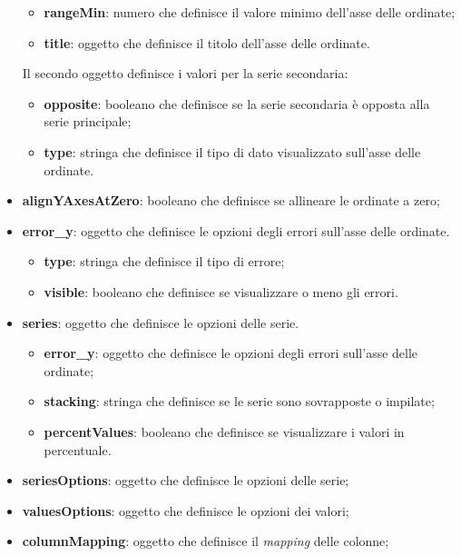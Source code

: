 \begin{itemize}
\begin{itemize}
                  \item \textbf{rangeMin}: numero che definisce il valore minimo dell'asse delle ordinate;
                  \item \textbf{title}: oggetto che definisce il titolo dell'asse delle ordinate.
            \end{itemize}
            Il secondo oggetto definisce i valori per la serie secondaria:
            \begin{itemize}
                  \item \textbf{opposite}: booleano che definisce se la serie secondaria è opposta alla serie principale;
                  \item \textbf{type}: stringa che definisce il tipo di dato visualizzato sull'asse delle ordinate.
            \end{itemize}
      \item \textbf{alignYAxesAtZero}: booleano che definisce se allineare le ordinate a zero;
      \item \textbf{error\_y}: oggetto che definisce le opzioni degli errori sull'asse delle ordinate.
            \begin{itemize}
                  \item \textbf{type}: stringa che definisce il tipo di errore;
                  \item \textbf{visible}: booleano che definisce se visualizzare o meno gli errori.
            \end{itemize}
      \item \textbf{series}: oggetto che definisce le opzioni delle serie.
            \begin{itemize}
                  \item \textbf{error\_y}: oggetto che definisce le opzioni degli errori sull'asse delle ordinate;
                  \item \textbf{stacking}: stringa che definisce se le serie sono sovrapposte o impilate;
                  \item \textbf{percentValues}: booleano che definisce se visualizzare i valori in percentuale.
            \end{itemize}
      \item \textbf{seriesOptions}: oggetto che definisce le opzioni delle serie;
      \item \textbf{valuesOptions}: oggetto che definisce le opzioni dei valori;
      \item \textbf{columnMapping}: oggetto che definisce il \textit{mapping} delle colonne;

\end{itemize}
